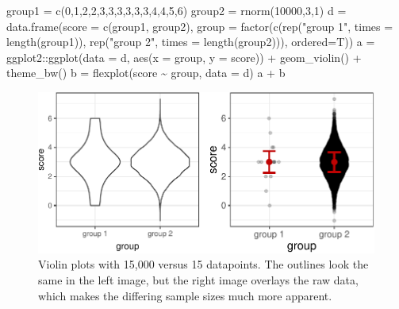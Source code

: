\documentclass[
  english,
  man]{apa6}
\newenvironment{Shaded}{\begin{snugshade}}{\end{snugshade}}
\newcommand{\AttributeTok}[1]{\textcolor[rgb]{0.77,0.63,0.00}{#1}}
\newcommand{\DecValTok}[1]{\textcolor[rgb]{0.00,0.00,0.81}{#1}}
\newcommand{\FunctionTok}[1]{\textcolor[rgb]{0.00,0.00,0.00}{#1}}
\newcommand{\NormalTok}[1]{#1}
\newcommand{\OtherTok}[1]{\textcolor[rgb]{0.56,0.35,0.01}{#1}}
\newcommand{\SpecialCharTok}[1]{\textcolor[rgb]{0.00,0.00,0.00}{#1}}
\newcommand{\StringTok}[1]{\textcolor[rgb]{0.31,0.60,0.02}{#1}}
\begin{document}
\begin{Shaded}
\begin{Highlighting}[]
\NormalTok{group1 }\OtherTok{=} \FunctionTok{c}\NormalTok{(}\DecValTok{0}\NormalTok{,}\DecValTok{1}\NormalTok{,}\DecValTok{2}\NormalTok{,}\DecValTok{2}\NormalTok{,}\DecValTok{3}\NormalTok{,}\DecValTok{3}\NormalTok{,}\DecValTok{3}\NormalTok{,}\DecValTok{3}\NormalTok{,}\DecValTok{3}\NormalTok{,}\DecValTok{3}\NormalTok{,}\DecValTok{4}\NormalTok{,}\DecValTok{4}\NormalTok{,}\DecValTok{5}\NormalTok{,}\DecValTok{6}\NormalTok{)}
\NormalTok{group2 }\OtherTok{=} \FunctionTok{rnorm}\NormalTok{(}\DecValTok{10000}\NormalTok{,}\DecValTok{3}\NormalTok{,}\DecValTok{1}\NormalTok{)}
\NormalTok{d }\OtherTok{=} \FunctionTok{data.frame}\NormalTok{(}\AttributeTok{score =} \FunctionTok{c}\NormalTok{(group1, group2), }
               \AttributeTok{group =} \FunctionTok{factor}\NormalTok{(}\FunctionTok{c}\NormalTok{(}\FunctionTok{rep}\NormalTok{(}\StringTok{"group 1"}\NormalTok{, }\AttributeTok{times =} \FunctionTok{length}\NormalTok{(group1)), }
                       \FunctionTok{rep}\NormalTok{(}\StringTok{"group 2"}\NormalTok{, }\AttributeTok{times =} \FunctionTok{length}\NormalTok{(group2))), }\AttributeTok{ordered=}\NormalTok{T))}
\NormalTok{a }\OtherTok{=}\NormalTok{ ggplot2}\SpecialCharTok{::}\FunctionTok{ggplot}\NormalTok{(}\AttributeTok{data =}\NormalTok{ d, }\FunctionTok{aes}\NormalTok{(}\AttributeTok{x =}\NormalTok{ group, }\AttributeTok{y =}\NormalTok{ score)) }\SpecialCharTok{+}  
  \FunctionTok{geom\_violin}\NormalTok{() }\SpecialCharTok{+} \FunctionTok{theme\_bw}\NormalTok{()}
\NormalTok{b }\OtherTok{=} \FunctionTok{flexplot}\NormalTok{(score }\SpecialCharTok{\textasciitilde{}}\NormalTok{ group, }\AttributeTok{data =}\NormalTok{ d)}
\NormalTok{a }\SpecialCharTok{+}\NormalTok{ b}
\end{Highlighting}
\end{Shaded}

\begin{figure}

{\centering \includegraphics[width=0.9\linewidth]{flexplot_psychmeth_files/figure-latex/raw-1} 

}

\caption{Violin plots with 15,000 versus 15 datapoints. The outlines look the same in the left image, but the right image overlays the raw data, which makes the differing sample sizes much more apparent. \label{fig:raw}}\label{fig:raw}
\end{figure}
\end{document}
